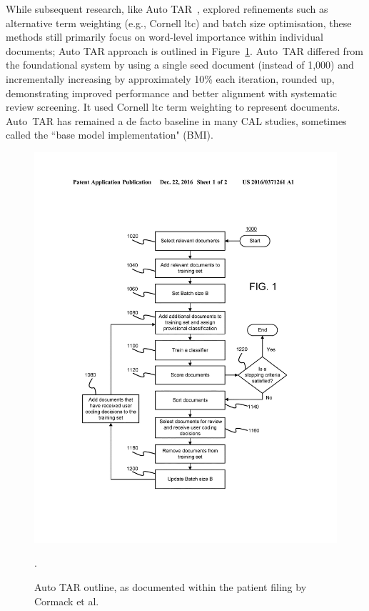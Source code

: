 \documentclass[10pt, english]{article}
\begin{document}
While subsequent research, like Auto TAR~\cite{cormack_autonomy_2015}, explored refinements such as alternative term weighting (e.g., Cornell ltc) and batch size optimisation, these methods still primarily focus on word-level importance within individual documents; Auto TAR approach is outlined in Figure~\ref{fig:autotar_process}. Auto~TAR differed from the foundational system by using a single seed document (instead of 1,000) and incrementally increasing by approximately 10\% each iteration, rounded up, demonstrating improved performance and better alignment with systematic review screening. It used Cornell ltc term weighting \cite{salton_smart_1965} to represent documents. Auto~TAR has remained a de facto baseline in many CAL studies, sometimes called the ``base model implementation" (BMI).

\begin{figure}
    \centering
    \includegraphics[width=1\linewidth]{images/autotar.jpg}
    \caption{Auto TAR outline, as documented within the patient filing by Cormack et al. \cite{cormack_systems_2016}}.
    \label{fig:autotar_process}
\end{figure}
\end{document}
